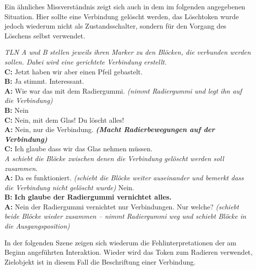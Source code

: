 Ein ähnliches Missverständnis zeigt sich auch in dem im folgenden angegebenen Situation. Hier sollte eine Verbindung gelöscht werden, das Löschtoken wurde jedoch wiederum nicht als Zustandsschalter, sondern für den Vorgang des Löschens selbst verwendet.

\begin{transkript}
	\emph{TLN A und B stellen jeweils ihren Marker zu den Blöcken, die verbunden werden sollen. Dabei wird eine gerichtete Verbindung erstellt.}\\
	\textbf{C:} Jetzt haben wir aber einen Pfeil gebastelt.\\
	\textbf{B:} Ja stimmt. Interessant.\\
	\textbf{A:} Wie war das mit dem Radiergummi. \emph{(nimmt Radiergummi und legt ihn auf die Verbindung)}\\
	\textbf{B:} Nein\\
	\textbf{C:} Nein, mit dem Glas! Du löscht alles!\\
	\textbf{A:} Nein, nur die Verbindung. \textbf{\emph{(Macht Radierbewegungen auf der Verbindung)}}\\
	\textbf{C:} Ich glaube dass wir das Glas nehmen müssen.\\
	\emph{A schiebt die Blöcke zwischen denen die Verbindung gelöscht werden soll zusammen.}\\
	\textbf{A:} Da es funktioniert. \emph{(schiebt die Blöcke weiter auseinander und bemerkt dass die Verbindung nicht gelöscht wurde)} Nein.\\
	\textbf{B:} \textbf{Ich glaube der Radiergummi vernichtet alles.}\\
	\textbf{A:} Nein der Radiergummi vernichtet nur Verbindungen. Nur welche? \emph{(schiebt beide Blöcke wieder zusammen – nimmt Radiergummi weg und schiebt Blöcke in die Ausgangsposition)}
\end{transkript}

In der folgenden Szene zeigen sich wiederum die Fehlinterpretationen der am Beginn angeführten Interaktion. Wieder wird das Token zum Radieren verwendet, Zielobjekt ist in diesem Fall die Beschriftung einer Verbindung.

